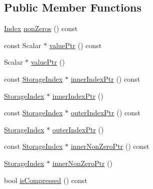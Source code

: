 \subsection*{Public Member Functions}
\begin{DoxyCompactItemize}
\item 
\mbox{\hyperlink{struct_eigen_1_1_eigen_base_a554f30542cc2316add4b1ea0a492ff02}{Index}} \mbox{\hyperlink{class_eigen_1_1_sparse_compressed_base_a03de8b3da2c142ce8698a76123b3e7d3}{non\+Zeros}} () const
\item 
const Scalar $\ast$ \mbox{\hyperlink{class_eigen_1_1_sparse_compressed_base_a0f44c739398794ea77f310b745cc5627}{value\+Ptr}} () const
\item 
Scalar $\ast$ \mbox{\hyperlink{class_eigen_1_1_sparse_compressed_base_a0f12f72d14b6c277d09be9f5ce2eab95}{value\+Ptr}} ()
\item 
const \mbox{\hyperlink{class_eigen_1_1_sparse_matrix_base_a0b540ba724726ebe953f8c0df06081ed}{Storage\+Index}} $\ast$ \mbox{\hyperlink{class_eigen_1_1_sparse_compressed_base_aa64818e1aa43015dad01b114b2ab4687}{inner\+Index\+Ptr}} () const
\item 
\mbox{\hyperlink{class_eigen_1_1_sparse_matrix_base_a0b540ba724726ebe953f8c0df06081ed}{Storage\+Index}} $\ast$ \mbox{\hyperlink{class_eigen_1_1_sparse_compressed_base_a197111c1289644f1ea38fe683ccdd82a}{inner\+Index\+Ptr}} ()
\item 
const \mbox{\hyperlink{class_eigen_1_1_sparse_matrix_base_a0b540ba724726ebe953f8c0df06081ed}{Storage\+Index}} $\ast$ \mbox{\hyperlink{class_eigen_1_1_sparse_compressed_base_a2624d4c2661c582de168246c56e8d71e}{outer\+Index\+Ptr}} () const
\item 
\mbox{\hyperlink{class_eigen_1_1_sparse_matrix_base_a0b540ba724726ebe953f8c0df06081ed}{Storage\+Index}} $\ast$ \mbox{\hyperlink{class_eigen_1_1_sparse_compressed_base_a53a82f962686e18c8dc07a4b9a85ed7b}{outer\+Index\+Ptr}} ()
\item 
const \mbox{\hyperlink{class_eigen_1_1_sparse_matrix_base_a0b540ba724726ebe953f8c0df06081ed}{Storage\+Index}} $\ast$ \mbox{\hyperlink{class_eigen_1_1_sparse_compressed_base_afc056a3895eae1a4c4767252ff04966a}{inner\+Non\+Zero\+Ptr}} () const
\item 
\mbox{\hyperlink{class_eigen_1_1_sparse_matrix_base_a0b540ba724726ebe953f8c0df06081ed}{Storage\+Index}} $\ast$ \mbox{\hyperlink{class_eigen_1_1_sparse_compressed_base_a411e972b097e6aef225415a4c2d0a0b5}{inner\+Non\+Zero\+Ptr}} ()
\item 
bool \mbox{\hyperlink{class_eigen_1_1_sparse_compressed_base_a837934b33a80fe996ff20500373d3a61}{is\+Compressed}} () const

\end{DoxyCompactItemize}
